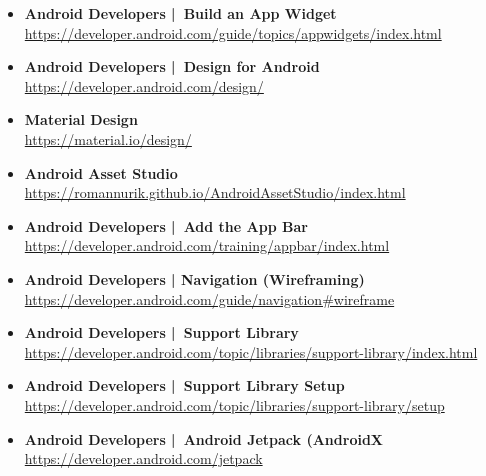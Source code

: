 \documentclass[a4paper]{article}
\begin{document}
{\begin{itemize}
		\item \textbf{Android Developers | Build an App Widget}\\
		\href{https://developer.android.com/guide/topics/appwidgets/index.html}
		{https://developer.android.com/guide/topics/appwidgets/index.html}
		
		\item \textbf{Android Developers | Design for Android}\\
		\href{https://developer.android.com/design/}
		{https://developer.android.com/design/}
		
		\item \textbf{Material Design}\\
		\href{https://material.io/design/}
		{https://material.io/design/}
		
		\item \textbf{Android Asset Studio}\\
		\href{https://romannurik.github.io/AndroidAssetStudio/index.html}
		{https://romannurik.github.io/AndroidAssetStudio/index.html}
		
		\item \textbf{Android Developers | Add the App Bar}\\
		\href{https://developer.android.com/training/appbar/index.html}
		{https://developer.android.com/training/appbar/index.html}
		
		\item \textbf{Android Developers | Navigation (Wireframing)}\\
		\href{https://developer.android.com/guide/navigation#wireframe}
		{https://developer.android.com/guide/navigation\#wireframe}
		
		\item \textbf{Android Developers | Support Library}\\
		\href{https://developer.android.com/topic/libraries/support-library/index.html}
		{https://developer.android.com/topic/libraries/support-library/index.html}
		
		\item \textbf{Android Developers | Support Library Setup}\\
		\href{https://developer.android.com/topic/libraries/support-library/setup}
		{https://developer.android.com/topic/libraries/support-library/setup}
		
		\item \textbf{Android Developers | Android Jetpack (AndroidX}\\
		\href{https://developer.android.com/jetpack}
		{https://developer.android.com/jetpack}
		

\end{itemize}}
\end{document}
